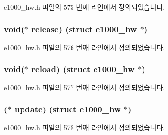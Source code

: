 e1000\+\_\+hw.\+h 파일의 575 번째 라인에서 정의되었습니다.

\subsubsection[{\texorpdfstring{release}{release}}]{\setlength{\rightskip}{0pt plus 5cm}void($\ast$ release) (struct {\bf e1000\+\_\+hw} $\ast$)}\hypertarget{structe1000__nvm__operations_a057bf49d5a21aeee7fcfd364257cb772}{}\label{structe1000__nvm__operations_a057bf49d5a21aeee7fcfd364257cb772}


e1000\+\_\+hw.\+h 파일의 576 번째 라인에서 정의되었습니다.

\subsubsection[{\texorpdfstring{reload}{reload}}]{\setlength{\rightskip}{0pt plus 5cm}void($\ast$ reload) (struct {\bf e1000\+\_\+hw} $\ast$)}\hypertarget{structe1000__nvm__operations_ab94130734905b02321cb0166060d2274}{}\label{structe1000__nvm__operations_ab94130734905b02321cb0166060d2274}


e1000\+\_\+hw.\+h 파일의 577 번째 라인에서 정의되었습니다.

\subsubsection[{\texorpdfstring{update}{update}}]{($\ast$ update) (struct {\bf e1000\+\_\+hw} $\ast$)}\hypertarget{structe1000__nvm__operations_af7bafd33db48aa69d8bde41f4bfab4b4}{}\label{structe1000__nvm__operations_af7bafd33db48aa69d8bde41f4bfab4b4}


e1000\+\_\+hw.\+h 파일의 578 번째 라인에서 정의되었습니다.


